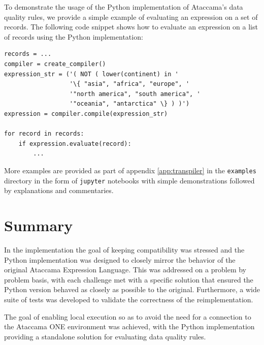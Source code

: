 To demonstrate the usage of the Python implementation of Ataccama's data quality rules, we provide a simple example of evaluating an expression on a set of records. The following code snippet shows how to evaluate an expression on a list of records using the Python implementation:

\begin{verbatim}
records = ...
compiler = create_compiler()
expression_str = ('( NOT ( lower(continent) in '
                  '\{ "asia", "africa", "europe", '
                  '"north america", "south america", '
                  '"oceania", "antarctica" \} ) )')
expression = compiler.compile(expression_str)

for record in records:
    if expression.evaluate(record):
        ...
\end{verbatim}

More examples are provided as part of appendix \ref{app:transpiler} in the \texttt{examples} directory in the form of \texttt{jupyter} \cite{jupyter} notebooks with simple demonstrations followed by explanations and commentaries. 

\section{Summary}

In the implementation the goal of keeping compatibility was stressed and the Python implementation was designed to closely mirror the behavior of the original Ataccama Expression Language. This was addressed on a problem by problem basis, with each challenge met with a specific solution that ensured the Python version behaved as closely as possible to the original. Furthermore, a wide suite of tests was developed to validate the correctness of the reimplementation.

The goal of enabling local execution so as to avoid the need for a connection to the Ataccama ONE environment was achieved, with the Python implementation providing a standalone solution for evaluating data quality rules.
